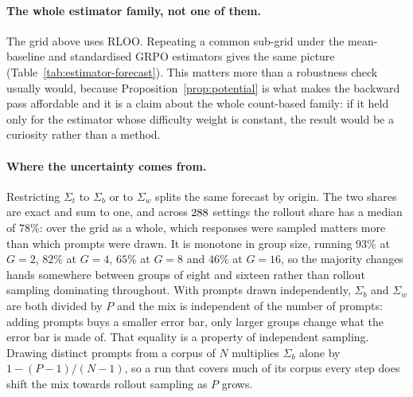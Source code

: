 \paragraph{The whole estimator family, not one of them.} The grid above uses RLOO. Repeating a
common sub-grid under the mean-baseline and standardised GRPO estimators gives the same picture
(Table~\ref{tab:estimator-forecast}). This matters more than a robustness check usually would,
because Proposition~\ref{prop:potential} is what makes the backward pass affordable and it is a
claim about the whole count-based family: if it held only for the estimator whose difficulty weight
is constant, the result would be a curiosity rather than a method.

\begin{table}[t]
  \centering
  
  \caption{The forecast under each estimator in the family. The RLOO row is the full grid; the two
  GRPO rows are a common sub-grid of twelve settings at matched difficulty bands, run lengths and
  group sizes. Those sub-grids predate storing per-seed scores, so the anchor run is counted among
  the seeds here, for RLOO too, which is why its row differs slightly from Table~\ref{tab:forecast}.}
  \label{tab:estimator-forecast}
\end{table}

\paragraph{Where the uncertainty comes from.} Restricting $\Sigma_t$ to $\Sigma_b$ or to
$\Sigma_w$ splits the same forecast by origin. The two shares are exact and sum to one, and across
$288$ settings the rollout share has a median of $78\%$: over the grid as a whole,
which responses were sampled matters more than which prompts were drawn. It is monotone in group
size, running $93\%$ at $G=2$, $82\%$ at $G=4$, $65\%$ at $G=8$ and $46\%$ at $G=16$, so the
majority changes hands somewhere between groups of eight and sixteen rather than rollout sampling
dominating throughout. With prompts drawn independently, $\Sigma_b$ and $\Sigma_w$ are both divided
by $P$ and the mix is independent of the number of prompts: adding prompts buys a smaller error
bar, only larger groups change what the error bar is made of. That equality is a property of
independent sampling. Drawing distinct prompts from a corpus of $N$ multiplies $\Sigma_b$ alone by
$1 - (P-1)/(N-1)$, so a run that covers much of its corpus every step does shift the mix towards
rollout sampling as $P$ grows.

